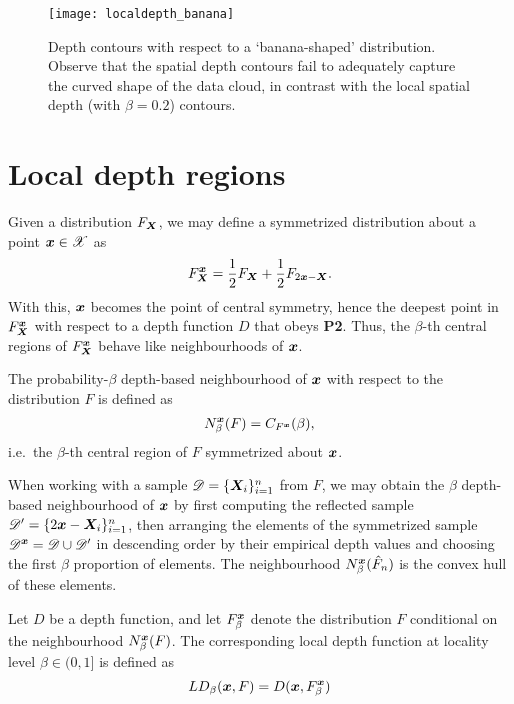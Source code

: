 

\begin{figure}
    \centering
    \texttt{[image: localdepth\_banana]}
    \caption{
        Depth contours with respect to a `banana-shaped' distribution.
        Observe that the spatial depth contours fail to adequately capture the
        curved shape of the data cloud, in contrast with the local spatial
        depth (with $\beta = 0.2$) contours.
    }
    \label{fig:localdepth_banana}
\end{figure}



\section{Local depth regions}

Given a distribution $F_{\bm{X}}$, we may define a symmetrized distribution about
a point $\bm{x} \in \mathscr{X}$ as
\begin{equation}
    F^{\bm{x}}_{\bm{X}} = \frac{1}{2}F_{\bm{X}} + \frac{1}{2}F_{2\bm{x} - \bm{X}}. \label{eq:local_symmetrization}
\end{equation}
With this, $\bm{x}$ becomes the point of central symmetry, hence the deepest
point in $F^{\bm{x}}_{\bm{X}}$ with respect to a depth function $D$ that obeys
\textbf{P2}.
Thus, the $\beta$-th central regions of $F^{\bm{x}}_{\bm{X}}$ behave like
neighbourhoods of $\bm{x}$.

\begin{definition}
    The probability-$\beta$ depth-based neighbourhood of $\bm{x}$ with respect to
    the distribution $F$ is defined as
    \begin{equation}
        N^{\bm{x}}_\beta(F) = C_{F^{\bm{x}}}(\beta),
    \end{equation}
    i.e.\ the $\beta$-th central region of $F$ symmetrized about $\bm{x}$.
\end{definition}

When working with a sample $\mathscr{D} = \{\bm{X}_i\}_{i = 1}^n$ from $F$, we
may obtain the $\beta$ depth-based neighbourhood of $\bm{x}$ by first computing
the reflected sample $\mathscr{D}' = \{2\bm{x} - \bm{X}_i\}_{i = 1}^n$, then
arranging the elements of the symmetrized sample $\mathscr{D}^{\bm{x}} =
\mathscr{D} \cup \mathscr{D}'$ in descending order by their empirical depth
values and choosing the first $\beta$ proportion of elements.
The neighbourhood $N^{\bm{x}}_\beta(\hat{F}_n)$ is the convex hull of these
elements.


\begin{definition}
    \label{def:localdepth}
    Let $D$ be a depth function, and let $F^{\bm{x}}_\beta$ denote the
    distribution $F$ conditional on the neighbourhood $N^{\bm{x}}_\beta(F)$.
    The corresponding local depth function at locality level $\beta \in (0,
    1]$ is defined as
    \begin{equation}
        LD_\beta(\bm{x}, F) = D(\bm{x}, F^{\bm{x}}_\beta)
    \end{equation}
\end{definition}

